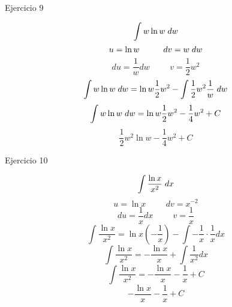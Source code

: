 \documentclass{amsart}
\begin{document}
    Ejercicio 9
    
    \[\int w \ln{w} \hspace{1mm} dw\]
    \[u = \ln{w} \hspace{1cm} dv = w \hspace{1mm} dw\]
    \[du = \frac{1}{w} dw \hspace{1cm} v = \frac{1}{2} w^{2}\]
    \[\int w \ln{w} \hspace{1mm} dw = \ln{w}\frac{1}{2}w^{2} - \int \frac{1}{2}w^{2}\frac{1}{w}\hspace{1mm} dw\]
    \[\int w \ln{w} \hspace{1mm} dw = \ln{w}\frac{1}{2}w^{2} - \frac{1}{4}w^{2} + C\]
    \[\frac{1}{2}w^{2} \ln{w} - \frac{1}{4}w^{2} + C\]
    
    Ejercicio 10
    
    \[\int \frac{\ln{x}}{x^{2}} \hspace{1mm} dx\]
    \[ u = \ln{x} \hspace{1cm} dv = x^{-2}\]
    \[ du = \frac{1}{x} dx \hspace{1cm} v = \frac{1}{x}\]
    \[\int \frac{\ln{x}}{x^{2}} = \ln{x}(-\frac{1}{x}) - \int -\frac{1}{x}\cdot\frac{1}{x} dx\]
    \[\int \frac{\ln{x}}{x^{2}} = -\frac{\ln{x}}{x} + \int \frac{1}{x^{2}} dx\]
    \[\int \frac{\ln{x}}{x^{2}} = -\frac{\ln{x}}{x} - \frac{1}{x} + C\]
    \[-\frac{\ln{x}}{x} - \frac{1}{x} + C\]
\end{document}
